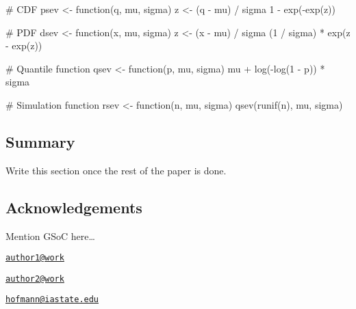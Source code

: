 \begin{Schunk}
\begin{Sinput}
# CDF
psev <- function(q, mu, sigma) {
    z <- (q - mu) / sigma
    1 - exp(-exp(z))
}

# PDF
dsev <- function(x, mu, sigma) {
  z <- (x - mu) / sigma
  (1 / sigma) * exp(z - exp(z))
}

# Quantile function
qsev <- function(p, mu, sigma) {
  mu + log(-log(1 - p)) * sigma
}

# Simulation function
rsev <- function(n, mu, sigma) {
  qsev(runif(n), mu, sigma)
}
\end{Sinput}
\end{Schunk}

\subsection{Summary}\label{summary}

Write this section once the rest of the paper is done.



\subsection{Acknowledgements}\label{acknowledgements}

Mention GSoC here\ldots{}

\address{%
Alexander Almeida\\
Affiliation\\
line 1\\ line 2\\
}
\href{mailto:author1@work}{\nolinkurl{author1@work}}

\address{%
Adam Loy\\
Affiliation\\
line 1\\ line 2\\
}
\href{mailto:author2@work}{\nolinkurl{author2@work}}

\address{%
Heike Hofmann\\
Iowa State University\\
Department of Statistics\\ Ames, IA 50011-1210\\
}
\href{mailto:hofmann@iastate.edu}{\nolinkurl{hofmann@iastate.edu}}

